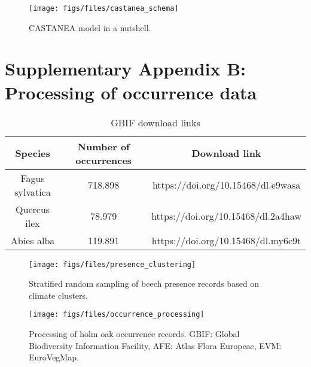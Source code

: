 \documentclass[11pt,]{article}
\begin{document}
\begin{figure}[htbp]

{\centering \texttt{[image: figs/files/castanea\_schema]} 

}

\caption{CASTANEA model in a nutshell.}\label{fig:phenofit_model}
\end{figure}

\newpage

\hypertarget{appendixB}{%
\section{Supplementary Appendix B: Processing of occurrence
data}\label{appendixB}}

\renewcommand*\thetable{B.\arabic{table}}
\renewcommand*\thefigure{B.\arabic{figure}}

\setcounter{figure}{0}
\setcounter{table}{0}

\renewcommand*{\thepage}{B--\arabic{page}}

\hfill \break

\begin{table}[!h]

\caption{\label{tab:unnamed-chunk-1}GBIF download links}
\centering
\begin{tabular}[t]{ccc}
\toprule
Species & Number of occurrences & Download link\\
\midrule
Fagus sylvatica & 718.898 & https://doi.org/10.15468/dl.e9wasa\\
Quercus ilex & 78.979 & https://doi.org/10.15468/dl.2a4haw\\
Abies alba & 119.891 & https://doi.org/10.15468/dl.my6c9t\\
\bottomrule
\end{tabular}
\end{table}

\hfill \break

\begin{figure}[htbp]

{\centering \texttt{[image: figs/files/presence\_clustering]} 

}

\caption{Stratified random sampling of beech presence records based on climate clusters.}\label{fig:pres_clustering}
\end{figure}

\begin{landscape}
\begin{figure}[htbp]

{\centering \texttt{[image: figs/files/occurrence\_processing]} 

}

\caption{Processing of holm oak occurrence records. GBIF: Global Biodiversity Information Facility, AFE: Atlas Flora Europeae, EVM: EuroVegMap.}\label{fig:occ_processing}
\end{figure}
\end{landscape}
\end{document}
